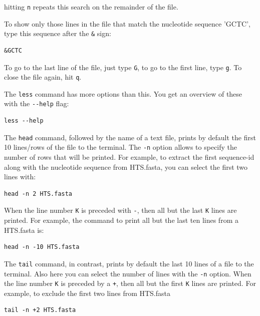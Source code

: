 \documentclass[11pt]{article}
\begin{document}
hitting \texttt{n} repeats this search on the remainder of the file.

To show only those lines in the file that match the nucleotide
sequence 'GCTC', type this sequence after the \texttt{\&} sign:

\begin{verbatim}
&GCTC
\end{verbatim}

To go to the last line of the file, just type \texttt{G}, to go to the first
line, type \texttt{g}. To close the file again, hit \texttt{q}.


The \texttt{less} command has more options than this. You get an overview of
these with the \texttt{-{}-help} flag:

\begin{verbatim}
less --help
\end{verbatim}


The \texttt{head} command, followed by the name of a text file, prints by
default the first 10 lines/rows of the file to the terminal.  The \texttt{-n}
option allows to specify the number of rows that will be
printed. For example, to extract the first sequence-id along with the
nucleotide sequence from HTS.fasta, you can select the first two lines
with:

\begin{verbatim}
head -n 2 HTS.fasta
\end{verbatim}

When the line number \texttt{K} is preceded with \texttt{-}, then all but the last \texttt{K}
lines are printed. For example, the command to print all but the last
ten lines from a HTS.fasta is:

\begin{verbatim}
head -n -10 HTS.fasta
\end{verbatim}

The \texttt{tail} command, in contrast, prints by default the last 10 lines
of a file to the terminal. Also here you can select the number of
lines with the \texttt{-n} option. When the line number \texttt{K} is preceded by a
\texttt{+}, then all but the first \texttt{K} lines are printed.  For example, to
exclude the first two lines from HTS.fasta

\begin{verbatim}
tail -n +2 HTS.fasta
\end{verbatim}
\end{document}
